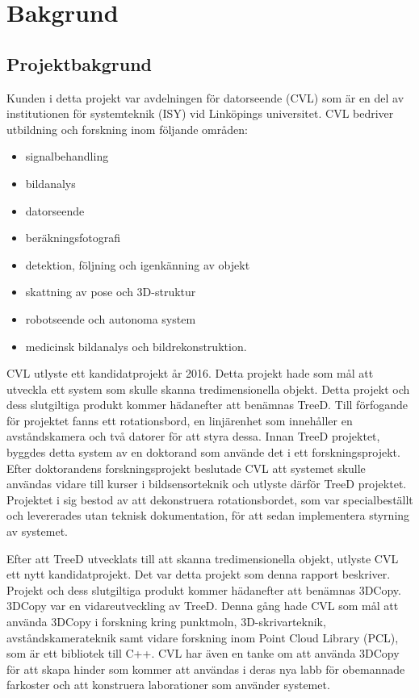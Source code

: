 \chapter{Bakgrund}
\label{cha:background}

\section{Projektbakgrund}
Kunden i detta projekt var avdelningen för datorseende (CVL) som är en del av institutionen för systemteknik (ISY) vid Linköpings universitet. CVL bedriver utbildning och forskning inom följande områden:
\begin{itemize}
	\item signalbehandling
	\item bildanalys
	\item datorseende
	\item beräkningsfotografi
	\item detektion, följning och igenkänning av objekt
	\item skattning av pose och 3D-struktur
	\item robotseende och autonoma system
	\item medicinsk bildanalys och bildrekonstruktion.
\end{itemize}

CVL utlyste ett kandidatprojekt år 2016. Detta projekt hade som mål att utveckla ett system som skulle skanna tredimensionella objekt. Detta projekt och dess slutgiltiga produkt kommer hädanefter att benämnas TreeD. Till förfogande för projektet fanns ett rotationsbord, en linjärenhet som innehåller en avståndskamera och två datorer för att styra dessa. Innan TreeD projektet, byggdes detta system av en doktorand som använde det i ett forskningsprojekt. Efter doktorandens forskningsprojekt beslutade CVL att systemet skulle användas vidare till kurser i bildsensorteknik och utlyste därför TreeD projektet. Projektet i sig bestod av att dekonstruera rotationsbordet, som var specialbeställt och levererades utan teknisk dokumentation, för att sedan implementera styrning av systemet.

Efter att TreeD utvecklats till att skanna tredimensionella objekt, utlyste CVL ett nytt kandidatprojekt. Det var detta projekt som denna rapport beskriver. Projekt och dess slutgiltiga produkt kommer hädanefter att benämnas 3DCopy.  3DCopy var en vidareutveckling av TreeD. Denna gång hade CVL som mål att använda 3DCopy i forskning kring punktmoln, 3D-skrivarteknik, avståndskamerateknik samt vidare forskning inom Point Cloud Library (PCL), som är ett bibliotek till C++. CVL har även en tanke om att använda 3DCopy för att skapa hinder som kommer att användas i deras nya labb för obemannade farkoster och att konstruera laborationer som använder systemet. 

